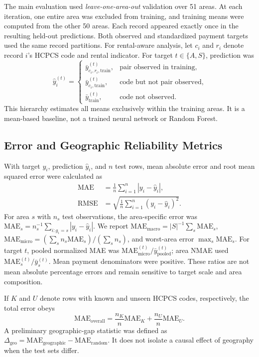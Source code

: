 The main evaluation used \emph{leave-one-area-out} validation over 51 areas. At each iteration, one entire area was excluded from training, and training means were computed from the other 50 areas. Each record appeared exactly once in the resulting held-out predictions. Both observed and standardized payment targets used the same record partitions. For rental-aware analysis, let $c_i$ and $r_i$ denote record $i$'s HCPCS code and rental indicator. For target $t\in\{A,S\}$, prediction was
\begin{equation}
\hat y_i^{(t)}=\begin{cases}
\bar y_{c_i,r_i,\mathrm{train}}^{(t)},&\text{pair observed in training},\\
\bar y_{c_i,\mathrm{train}}^{(t)},&\text{code but not pair observed},\\
\bar y_{\mathrm{train}}^{(t)},&\text{code not observed}.
\end{cases}
\label{eq:rentalaware}
\end{equation}
This hierarchy estimates all means exclusively within the training areas. It is a mean-based baseline, not a trained neural network or Random Forest.

\subsection{Error and Geographic Reliability Metrics}
With target $y_i$, prediction $\hat y_i$, and $n$ test rows, mean absolute error and root mean squared error were calculated as
\begin{align}
\mathrm{MAE}&=\frac1n\sum_{i=1}^n|y_i-\hat y_i|,\label{eq:mae}\\
\mathrm{RMSE}&=\sqrt{\frac1n\sum_{i=1}^n(y_i-\hat y_i)^2}.\label{eq:rmse}
\end{align}
For area $s$ with $n_s$ test observations, the area-specific error was $\mathrm{MAE}_s=n_s^{-1}\sum_{i:g_i=s}|y_i-\hat y_i|$. We report $\mathrm{MAE}_{\mathrm{macro}}=|S|^{-1}\sum_s\mathrm{MAE}_s$, $\mathrm{MAE}_{\mathrm{micro}}=(\sum_s n_s\mathrm{MAE}_s)/(\sum_s n_s)$, and worst-area error $\max_s\mathrm{MAE}_s$. For target $t$, pooled normalized MAE was $\mathrm{MAE}_{\mathrm{micro}}^{(t)}/\bar y_{\mathrm{pooled}}^{(t)}$; area NMAE used $\mathrm{MAE}_s^{(t)}/\bar y_s^{(t)}$. Mean payment denominators were positive. These ratios are not mean absolute percentage errors and remain sensitive to target scale and area composition.

If $K$ and $U$ denote rows with known and unseen HCPCS codes, respectively, the total error obeys
\begin{equation}
\mathrm{MAE}_{\mathrm{overall}}=\frac{n_K}{n}\mathrm{MAE}_K+\frac{n_U}{n}\mathrm{MAE}_U.\label{eq:decomp}
\end{equation}
A preliminary geographic-gap statistic was defined as $\Delta_{\mathrm{geo}}=\mathrm{MAE}_{\mathrm{geographic}}-\mathrm{MAE}_{\mathrm{random}}$. It does not isolate a causal effect of geography when the test sets differ.


